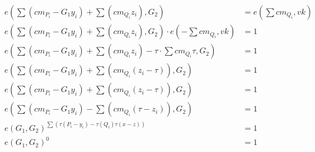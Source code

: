 \documentclass[10pt]{article}
\begin{document}
\[
\begin{aligned}
    e(\sum{(cm_{P_i} - G_1 y_i)} + \sum{(cm_{Q_i} z_i)}, G_2) &= e(\sum{cm_{Q_i}}, vk)\\
    e(\sum{(cm_{P_i} - G_1 y_i)} + \sum{(cm_{Q_i} z_i)}, G_2) \cdot e(-\sum{cm_{Q_i}}, vk) &= 1 \\
    e(\sum{(cm_{P_i} - G_1 y_i)} + \sum{(cm_{Q_i} z_i)} - \tau \cdot \sum{cm_{Q_i}\tau}, G_2) &= 1 \\
    e(\sum{(cm_{P_i} - G_1 y_i)} + \sum{(cm_{Q_i} (z_i-\tau))}, G_2) &= 1 \\
    e(\sum{(cm_{P_i} - G_1 y_i)} + \sum{(cm_{Q_i} (z_i-\tau))}, G_2) &= 1 \\
    e(\sum{(cm_{P_i} - G_1 y_i)} - \sum{(cm_{Q_i} (\tau - z_i))}, G_2) &= 1 \\
    e(G_1, G_2)^{\sum{(\tau(P_i - y_i) - \tau(Q_i)\tau(x-z))}} &= 1 \\
    e(G_1, G_2)^0 &= 1\\
\end{aligned}
\]
\end{document}

